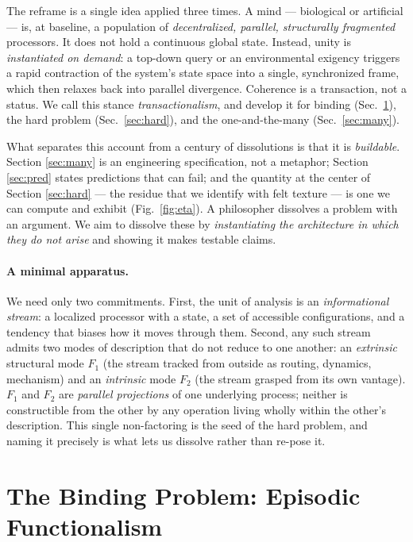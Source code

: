 \documentclass[11pt]{article}
\begin{document}
The reframe is a single idea applied three times. A mind --- biological or artificial --- is, at
baseline, a population of \emph{decentralized, parallel, structurally fragmented} processors. It does
not hold a continuous global state. Instead, unity is \emph{instantiated on demand}: a top-down query
or an environmental exigency triggers a rapid contraction of the system's state space into a single,
synchronized frame, which then relaxes back into parallel divergence. Coherence is a transaction, not a
status. We call this stance \emph{transactionalism}, and develop it for binding
(Sec.~\ref{sec:binding}), the hard problem (Sec.~\ref{sec:hard}), and the one-and-the-many
(Sec.~\ref{sec:many}).

What separates this account from a century of dissolutions is that it is \emph{buildable}. Section
\ref{sec:many} is an engineering specification, not a metaphor; Section \ref{sec:pred} states
predictions that can fail; and the quantity at the center of Section \ref{sec:hard} --- the residue
that we identify with felt texture --- is one we can compute and exhibit (Fig.~\ref{fig:eta}). A
philosopher dissolves a problem with an argument. We aim to dissolve these by \emph{instantiating the
architecture in which they do not arise} and showing it makes testable claims.

\paragraph{A minimal apparatus.} We need only two commitments. First, the unit of analysis is an
\emph{informational stream}: a localized processor with a state, a set of accessible configurations,
and a tendency that biases how it moves through them. Second, any such stream admits two modes of
description that do not reduce to one another: an \emph{extrinsic} structural mode $F_1$ (the stream
tracked from outside as routing, dynamics, mechanism) and an \emph{intrinsic} mode $F_2$ (the stream
grasped from its own vantage). $F_1$ and $F_2$ are \emph{parallel projections} of one underlying
process; neither is constructible from the other by any operation living wholly within the other's
description. This single non-factoring is the seed of the hard problem, and naming it precisely is what
lets us dissolve rather than re-pose it.

\section{The Binding Problem: Episodic Functionalism}
\label{sec:binding}
\end{document}

